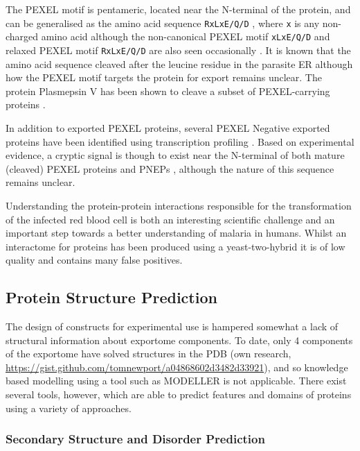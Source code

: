\documentclass[fleqn,10pt]{article} %
\begin{document}
The PEXEL motif is pentameric, located near the N-terminal of the protein, and can be generalised as the amino acid sequence \texttt{RxLxE/Q/D} \cite{Goldberg2010}, where \texttt{x} is any non-charged amino acid \cite{Dietz2014} although the non-canonical PEXEL motif \texttt{xLxE/Q/D} and relaxed PEXEL motif \texttt{RxLxE/Q/D} are also seen occasionally \cite{Elsworth2014}. It is known that the amino acid sequence cleaved after the leucine residue in the parasite ER \cite{Goldberg2010} although how the PEXEL motif targets the protein for export remains unclear. The \pf protein Plasmepsin V has been shown to cleave a subset of PEXEL-carrying proteins \cite{Boddey2013}.


In addition to exported PEXEL proteins, several PEXEL Negative exported proteins have been identified using transcription profiling \cite{Heiber2013}. Based on experimental evidence, a cryptic signal is though to exist near the N-terminal of both mature (cleaved) PEXEL proteins and PNEPs \cite{Gruring2012}, although the nature of this sequence remains unclear.

Understanding the protein-protein interactions responsible for the transformation of the infected red blood cell is both an interesting scientific challenge and an important step towards a better understanding of malaria in humans. Whilst an interactome for \pf proteins has been produced using a yeast-two-hybrid \cite{LaCount2005} it is of low quality and contains many false positives.

\subsection{Protein Structure Prediction}

The design of constructs for experimental use is hampered somewhat a lack of structural information about \pf exportome components. To date, only 4 components of the \pf exportome have solved structures in the PDB (own research, \url{https://gist.github.com/tomnewport/a04868602d3482d33921}), and so knowledge based modelling using a tool such as MODELLER \cite{Eswar2007} is not applicable. There exist several tools, however, which are able to predict features and domains of proteins using a variety of approaches.

\subsubsection*{Secondary Structure and Disorder Prediction}
\end{document}
